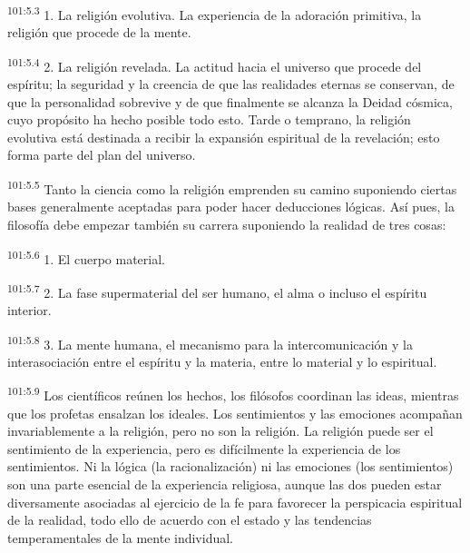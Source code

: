 \par
\textsuperscript{101:5.3} 1. La religión evolutiva. La experiencia de la adoración primitiva, la religión que procede de la mente.

\par
\textsuperscript{101:5.4} 2. La religión revelada. La actitud hacia el universo que procede del espíritu; la seguridad y la creencia de que las realidades eternas se conservan, de que la personalidad sobrevive y de que finalmente se alcanza la Deidad cósmica, cuyo propósito ha hecho posible todo esto. Tarde o temprano, la religión evolutiva está destinada a recibir la expansión espiritual de la revelación; esto forma parte del plan del universo.

\par
\textsuperscript{101:5.5} Tanto la ciencia como la religión emprenden su camino suponiendo ciertas bases generalmente aceptadas para poder hacer deducciones lógicas. Así pues, la filosofía debe empezar también su carrera suponiendo la realidad de tres cosas:

\par
\textsuperscript{101:5.6} 1. El cuerpo material.

\par
\textsuperscript{101:5.7} 2. La fase supermaterial del ser humano, el alma o incluso el espíritu interior.

\par
\textsuperscript{101:5.8} 3. La mente humana, el mecanismo para la intercomunicación y la interasociación entre el espíritu y la materia, entre lo material y lo espiritual.

\par
\textsuperscript{101:5.9} Los científicos reúnen los hechos, los filósofos coordinan las ideas, mientras que los profetas ensalzan los ideales. Los sentimientos y las emociones acompañan invariablemente a la religión, pero no son la religión. La religión puede ser el sentimiento de la experiencia, pero es difícilmente la experiencia de los sentimientos. Ni la lógica (la racionalización) ni las emociones (los sentimientos) son una parte esencial de la experiencia religiosa, aunque las dos pueden estar diversamente asociadas al ejercicio de la fe para favorecer la perspicacia espiritual de la realidad, todo ello de acuerdo con el estado y las tendencias temperamentales de la mente individual.

